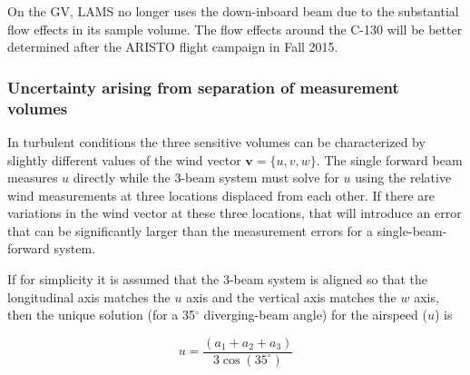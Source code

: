 \documentclass[12pt,twoside,english]{article}\usepackage[]{graphicx}\usepackage[]{color}
\let\OrgIndex\index
\renewcommand*{\index}[1]{\OrgIndex{#1}}
\begin{document}
On the GV, LAMS no longer uses the down-inboard beam due to the substantial flow effects in its sample volume. The flow effects around the C-130 will be better determined after the ARISTO flight campaign in Fall 2015. 

\subsubsection{Uncertainty arising from separation of measurement volumes}


In turbulent conditions  the three sensitive volumes can be characterized by slightly different values of the wind vector $\mathbf{v}=\{u,v,w\}.$ The single forward beam measures $u$ directly while the 3-beam system must solve for $u$ using the relative wind measurements at three locations displaced from each other. If there are variations in the wind vector at these three locations, that will introduce an error that can be significantly larger than the measurement errors for a single-beam-forward system. 

If for simplicity it is assumed that the 3-beam system is aligned so that the longitudinal axis matches the $u$ axis and the vertical axis matches the $w$ axis, then the unique solution (for a 35$^{\circ}$ diverging-beam angle) for the airspeed ($u$) is 

\begin{equation}
u=\frac{(a_{1}+a_{2}+a_{3})}{3\cos(35^{\circ})}\label{eq:TAS3beam} 
\end{equation}
\end{document}
